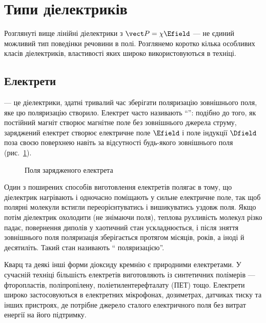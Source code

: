 \section{Типи діелектриків}

Розглянуті вище лінійні діелектрики з $\vect P = \chi\Efield$ --- не єдиний можливий тип поведінки речовини в полі. Розглянемо коротко кілька
особливих класів діелектриків, властивості яких широко використовуються в техніці.

\subsection*{Електрети}

 --- це діелектрики, здатні тривалий час зберігати поляризацію  зовнішнього поля, яке цю поляризацію створило.
Електрет часто називають \enquote{}: подібно до того, як постійний магніт створює магнітне поле без
зовнішнього джерела струму, заряджений електрет створює електричне поле $\Efield$ і поле індукції $\Dfield$ поза своєю поверхнею навіть за
відсутності будь-якого зовнішнього поля (рис.~\ref{pic:Electret}).

\begin{figure}[h!]\centering
	\caption{Поля зарядженого електрета\label{pic:Electret}}
\end{figure}

Один з поширених способів виготовлення електретів полягає в тому, що діелектрик нагрівають і одночасно поміщають у сильне електричне поле, так щоб
полярні молекули встигли переорієнтуватись і вишикуватись уздовж поля. Якщо потім діелектрик охолодити (не знімаючи поля), теплова рухливість
молекул різко падає, повернення диполів у хаотичний стан ускладнюється, і після зняття зовнішнього поля поляризація зберігається протягом місяців,
років, а іноді й десятиліть. Такий стан називають \enquote{ поляризацією}.

Кварц та деякі інші форми діоксиду кремнію є природними електретами. У сучасній техніці більшість електретів виготовляють із синтетичних полімерів
--- фторопластів, поліпропілену, поліетилентерефталату (ПЕТ) тощо. Електрети широко застосовуються в електретних мікрофонах, дозиметрах, датчиках
тиску та інших пристроях, де потрібне джерело сталого електричного поля без витрат енергії на його підтримку.

